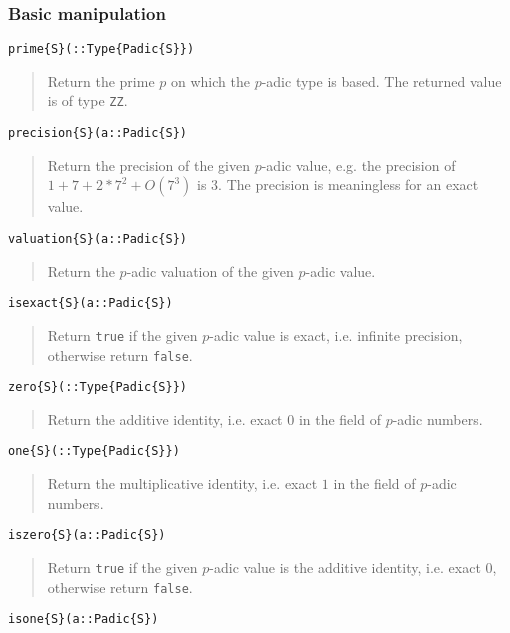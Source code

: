 \documentclass[a4paper,10pt]{article}
\newcommand{\code}{\lstinline}
\newcommand{\desc}[1]{\vspace{-3mm}\begin{quote}#1\end{quote}}
\begin{document}
{{{\subsubsection{Basic manipulation}

\begin{lstlisting}
prime{S}(::Type{Padic{S}})
\end{lstlisting}

\desc{Return the prime $p$ on which the $p$-adic type is based. The returned
value is of type \code{ZZ}.}

\begin{lstlisting}
precision{S}(a::Padic{S})
\end{lstlisting}

\desc{Return the precision of the given $p$-adic value, e.g. the precision of
$1 + 7 + 2*7^2 + O(7^3)$ is $3$. The precision is meaningless for an
exact value.}

\begin{lstlisting}
valuation{S}(a::Padic{S})
\end{lstlisting}

\desc{Return the $p$-adic valuation of the given $p$-adic value.}

\begin{lstlisting}
isexact{S}(a::Padic{S})
\end{lstlisting}

\desc{Return \code{true} if the given $p$-adic value is exact, i.e. infinite
precision, otherwise return \code{false}.}

\begin{lstlisting}
zero{S}(::Type{Padic{S}})
\end{lstlisting}

\desc{Return the additive identity, i.e. exact $0$ in the field of $p$-adic
numbers.}

\begin{lstlisting}
one{S}(::Type{Padic{S}})
\end{lstlisting}

\desc{Return the multiplicative identity, i.e. exact $1$ in the field of
$p$-adic numbers.}

\begin{lstlisting}
iszero{S}(a::Padic{S})
\end{lstlisting}

\desc{Return \code{true} if the given $p$-adic value is the additive identity,
i.e. exact $0$, otherwise return \code{false}.}

\begin{lstlisting}
isone{S}(a::Padic{S})
\end{lstlisting}

}}}
\end{document}
